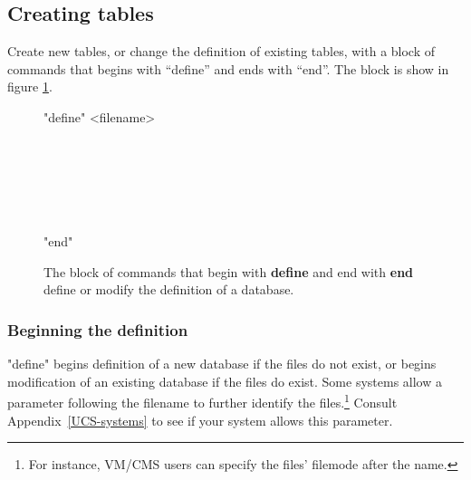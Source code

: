 \subsection{Creating tables}
Create new tables, or change the definition of
existing tables, with a block of commands that begins with
``define'' and ends with ``end''.  The block is show
in figure \ref{define}.
 
\begin{figure}[htp]
\<"define" <filename> \\
   \\
   \\
   \\
   \\
   \\
   \\
   "end"\>
 
\caption[Table definition block]
 {The block of commands that begin with {\bf define} and end with
   {\bf end} define or modify the definition of a database.}
\label{define}
\end{figure}
 
\subsubsection{Beginning the definition}
%
\<"define" \>
begins definition of a new database if the files do not exist, or
begins modification of an existing database if the files do exist.
Some systems allow a parameter following the filename to further
identify the files.\footnote{For instance, VM/CMS users can
specify the files' filemode after the name.}
Consult Appendix~\ref{UCS-systems}
to see if your system allows this parameter.
 
